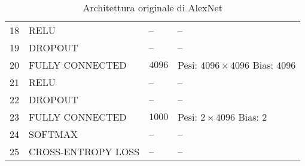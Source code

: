 \begin{table}[h]
\begin{tabularx}{\textwidth}{@{}llll@{}}
18 & RELU            & --            &     --      \\
19 & DROPOUT         & --            &    --       \\ \midrule
20 & FULLY CONNECTED &$4096$&\acapo{Pesi: $4096\times 4096$\\Bias: $4096$}\\
21 & RELU            & --            &   --        \\
22 & DROPOUT         & --            &   --        \\ \midrule
23 & FULLY CONNECTED &$1000$&\acapo{Pesi: $2\times 4096$\\Bias: $2$}\\
24 & SOFTMAX         & --            &    --       \\
25 & CROSS-ENTROPY LOSS  & --            &   --     \\ \bottomrule
\end{tabularx}
\caption{Architettura originale di AlexNet}
\label{tab_arc_alexnet}
\end{table}

